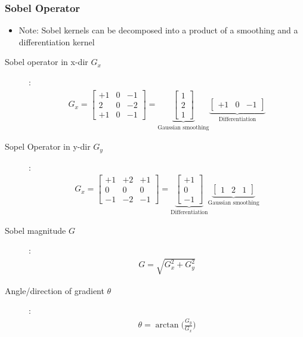 \documentclass[letterpaper,12pt]{article}
\begin{document}
\subsubsection{Sobel Operator}
\begin{itemize}
 \item Note: Sobel kernels can be decomposed into a product of a smoothing and a differentiation kernel
\end{itemize}
\begin{description}
 \item[Sobel operator in x-dir $G_x$]:
       \begin{align}
        G_x = \begin{bmatrix}
         +1 & 0 & -1 \\
         2  & 0 & -2 \\
         +1 & 0 & -1
        \end{bmatrix}
        = \underbrace{\begin{bmatrix}
          1 \\
          2 \\
          1
         \end{bmatrix}}_\text{Gaussian smoothing}
        \underbrace{\begin{bmatrix}
          +1 & 0 & -1
         \end{bmatrix}}_\text{Differentiation}
       \end{align}
 \item[Sopel Operator in y-dir $G_y$]:
       \begin{align}
        G_x = \begin{bmatrix}
         +1 & +2 & +1 \\
         0  & 0  & 0  \\
         -1 & -2 & -1
        \end{bmatrix}
        =
        \underbrace{\begin{bmatrix}
          +1 \\
          0  \\
          -1
         \end{bmatrix}}_\text{Differentiation}
        \underbrace{\begin{bmatrix}
          1 & 2 & 1
         \end{bmatrix}}_\text{Gaussian smoothing}
       \end{align}
 \item[Sobel magnitude $G$]:
       \begin{align}
        G = \sqrt{G_x^2 + G_y^2}
       \end{align}
 \item[Angle/direction of gradient $\theta$]:
       \begin{align}
        \theta = \arctan\bigg(\frac{G_y}{G_x}\bigg)
       \end{align}
\end{description}
\end{document}
